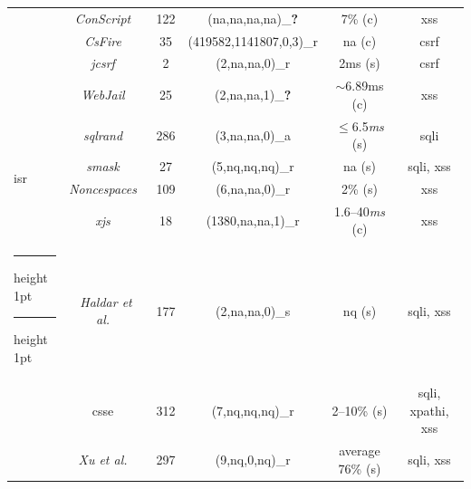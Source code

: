 \documentclass[conference]{IEEEtran}
\makeatletter
\newcommand{\tick}{\ding{52}}
\newcommand{\xmark}{\ding{56}}
\newcommand{\thickhline}{%
    \noalign {\ifnum 0=`}\fi \hrule height 1pt
    \futurelet \reserved@a \@xhline
}
\makeatother
\begin{document}
\begin{table}
\begin{threeparttable}
\begin{small}
{\begin{tabular}{l|c|c|cc|c}
  &   {\it ConScript}~\cite{ML10} & 122 & ({\sc na},{\sc na},{\sc na},{\sc na})\_{\bf ?} & 7\% ({\sc c}) & {\sc xss} \\
  &   {\it CsFire}~\cite{DDHPJ10} & 35 & (419582,1141807,0,3)\_r\tnote{5} & {\sc na} ({\sc c}) & {\sc csrf} \\
  &   {\it j{\sc csrf}}~\cite{PS11} & 2 & (2,{\sc na},{\sc na},0)\_r & 2ms ({\sc s}) & {\sc csrf} \\
  &   {\it WebJail}~\cite{VDDPJ11} & 25 & (2,{\sc na},{\sc na},1)\_{\bf ?} & $\sim$6.89ms ({\sc c}) & {\sc xss} \\
  \hline
  \multirow{4}{*}{{\sc isr}}
  &   {\it {\sc sql}rand}~\cite{BK04} & 286 & (3,{\sc na},{\sc na},0)\_a & $\le$6.5{\it ms} ({\sc s}) & {\sc sql}i \\
  &   {\it {\sc sm}ask}~\cite{JB07} & 27 & (5,{\sc nq},{\sc nq},{\sc nq})\_r  & {\sc na} ({\sc s}) & {\sc sql}i, {\sc xss} \\
  &   {\it Noncespaces}~\cite{GC09} & 109 & (6,{\sc na},{\sc na},0)\_r &  2\% ({\sc s}) & {\sc xss} \\ 
  &   {\it x{\sc js}}~\cite{APKLM10} & 18 & (1380,{\sc na},{\sc na},1)\_r & 1.6--40{\it ms} ({\sc c}) & {\sc xss} \\
  \thickhline
  \thickhline
  \multirow{7}{*}{Taint Tracking}
  &   {\it Haldar et al.}~\cite{HCF05} & 177 & (2,{\sc na},{\sc na},0)\_s & {\sc nq} ({\sc s}) & {\sc sql}i, {\sc xss} \\ 
  &   {\sc csse}~\cite{PB05} & 312 & (7,{\sc nq},{\sc nq},{\sc nq})\_r & 2--10\% ({\sc s}) & {\sc sql}i, {\sc xp}athi, {\sc xss} \\
  &   {\it Xu et al.}~\cite{XBS06} & 297 & (9,{\sc nq},0,{\sc nq})\_r & average 76\% ({\sc s}) & {\sc sql}i, {\sc xss} \\ 

\end{tabular}}
\end{small}
\end{threeparttable}
\end{table}
\end{document}
